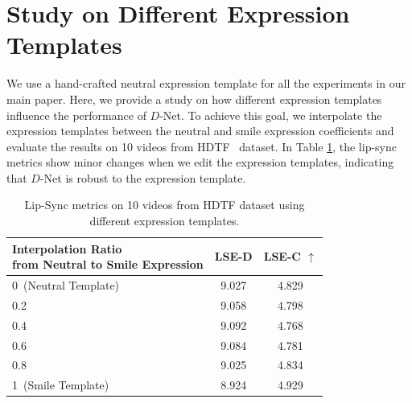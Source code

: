 \section{Study on Different Expression Templates}
We use a hand-crafted neutral expression template for all the experiments in our main paper. Here, we provide a study on how different expression templates influence the performance of $D$-Net. To achieve this goal, 
we interpolate the expression templates between the neutral and smile expression coefficients and evaluate the results on 10 videos from HDTF~\cite{hdtf} dataset. In Table \ref{tab:templates}, the lip-sync metrics show minor changes when we edit the expression templates, indicating that $D$-Net is robust to the expression template.

\begin{table}[h]
\centering
\caption{Lip-Sync metrics on 10 videos from HDTF dataset using different expression templates.}
\vspace{-1em}
\label{tab:templates}
\begin{tabular}{lcc}
\toprule
\makecell[c]{Interpolation Ratio \\ from Neutral to Smile Expression} & LSE-D  & LSE-C $\uparrow$ \\
\hline
 0~(Neutral Template) & 9.027 & 4.829 \\
 0.2         & 9.058 & 4.798 \\
 0.4         & 9.092 & 4.768 \\ 
 0.6         & 9.084 & 4.781 \\
 0.8         & 9.025 & 4.834 \\
 1~(Smile Template)  & 8.924 & 4.929 \\
\bottomrule 
\end{tabular}
\end{table}